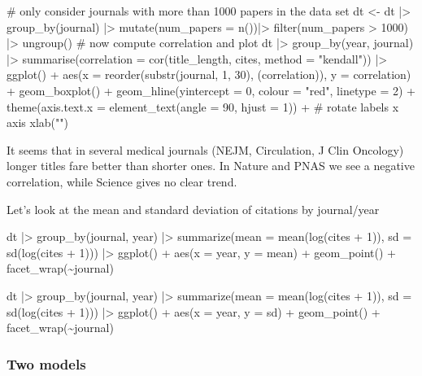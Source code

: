 \documentclass[
  letterpaper,
  DIV=11,
  numbers=noendperiod]{scrreprt}
\newenvironment{Shaded}{\begin{snugshade}}{\end{snugshade}}
\newcommand{\NormalTok}[1]{\textcolor[rgb]{0.00,0.23,0.31}{#1}}
\begin{document}
\begin{Shaded}
\begin{Highlighting}[]
\NormalTok{\# only consider journals with more than 1000 papers in the data set}
\NormalTok{dt \textless{}{-} dt |\textgreater{} }
\NormalTok{  group\_by(journal) |\textgreater{} }
\NormalTok{  mutate(num\_papers = n())|\textgreater{} }
\NormalTok{  filter(num\_papers \textgreater{} 1000) |\textgreater{} }
\NormalTok{  ungroup()}
\NormalTok{\# now compute correlation and plot}
\NormalTok{dt |\textgreater{} }
\NormalTok{  group\_by(year, journal) |\textgreater{} }
\NormalTok{  summarise(correlation = cor(title\_length, cites, method = "kendall")) |\textgreater{} }
\NormalTok{  ggplot() + }
\NormalTok{  aes(x = reorder(substr(journal, 1, 30), (correlation)), y = correlation) + }
\NormalTok{  geom\_boxplot() + }
\NormalTok{  geom\_hline(yintercept = 0, colour = "red", linetype = 2) +}
\NormalTok{  theme(axis.text.x = element\_text(angle = 90, hjust = 1)) +  \# rotate labels x axis}
\NormalTok{  xlab("")}
\end{Highlighting}
\end{Shaded}

It seems that in several medical journals (NEJM, Circulation, J Clin
Oncology) longer titles fare better than shorter ones. In Nature and
PNAS we see a negative correlation, while Science gives no clear trend.

Let's look at the mean and standard deviation of citations by
journal/year

\begin{Shaded}
\begin{Highlighting}[]
\NormalTok{dt |\textgreater{} }
\NormalTok{  group\_by(journal, year) |\textgreater{} }
\NormalTok{  summarize(mean = mean(log(cites + 1)), sd = sd(log(cites + 1))) |\textgreater{} }
\NormalTok{  ggplot() + }
\NormalTok{  aes(x = year, y = mean) + }
\NormalTok{  geom\_point() + }
\NormalTok{  facet\_wrap(\textasciitilde{}journal)}

\NormalTok{dt |\textgreater{} }
\NormalTok{  group\_by(journal, year) |\textgreater{} }
\NormalTok{  summarize(mean = mean(log(cites + 1)), sd = sd(log(cites + 1))) |\textgreater{} }
\NormalTok{  ggplot() + }
\NormalTok{  aes(x = year, y = sd) + }
\NormalTok{  geom\_point() + }
\NormalTok{  facet\_wrap(\textasciitilde{}journal)}
\end{Highlighting}
\end{Shaded}

\subsubsection{Two models}\label{two-models}
\end{document}
